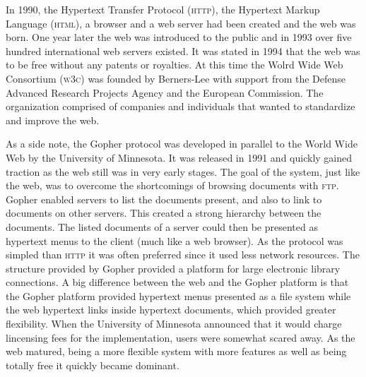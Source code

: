 \documentclass[a4paper,11pt]{kth-mag}
\begin{document}
          In 1990, the Hypertext Transfer Protocol (\textsc{http}), the Hypertext Markup Language (\textsc{html}), a browser and a web server had been created and the web was born.
          One year later the web was introduced to the public and in 1993 over five hundred international web servers existed.
          It was stated in 1994 that the web was to be free without any patents or royalties.
          At this time the Wolrd Wide Web Consortium (\textsc{w3c}) was founded by Berners-Lee with support from the Defense Advanced Research Projects Agency and the European Commission.
          The organization comprised of companies and individuals that wanted to standardize and improve the web.

          As a side note, the Gopher protocol was developed in parallel to the World Wide Web by the University of Minnesota.
          It was released in 1991 and quickly gained traction as the web still was in very early stages.
          The goal of the system, just like the web, was to overcome the shortcomings of browsing documents with \textsc{ftp}.
          Gopher enabled servers to list the documents present, and also to link to documents on other servers.
          This created a strong hierarchy between the documents.
          The listed documents of a server could then be presented as hypertext menus to the client (much like a web browser).
          As the protocol was simpled than \textsc{http} it was often preferred since it used less network resources.
          The structure provided by Gopher provided a platform for large electronic library connections.
          A big difference between the web and the Gopher platform is that the Gopher platform provided hypertext menus presented as a file system while the web hypertext links inside hypertext documents, which provided greater flexibility.
          When the University of Minnesota announced that it would charge lincensing fees for the implementation, users were somewhat scared away.
          As the web matured, being a more flexible system with more features as well as being totally free it quickly became dominant.
\end{document}
